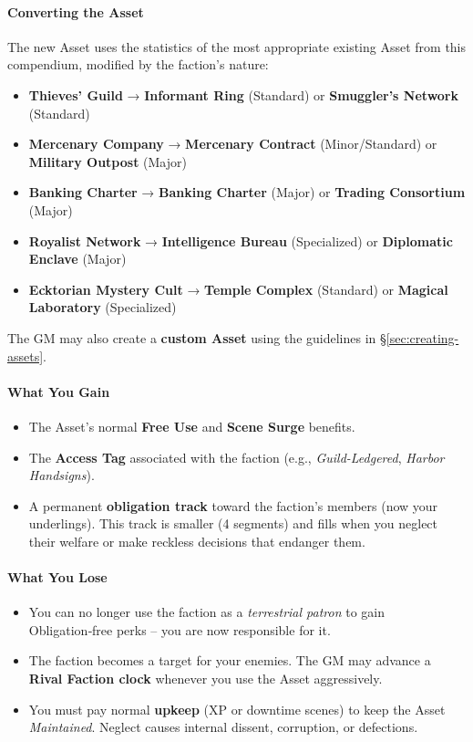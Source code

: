 \begin{tcolorbox}[colback=black!3!white,colframe=black!60!white,title={From Faction to Asset: Taking Over a Terrestrial Patron}]
  \paragraph{Converting the Asset}
  The new Asset uses the statistics of the most appropriate existing Asset from this compendium, modified by the faction’s nature:
  \begin{itemize}
    \item \textbf{Thieves’ Guild} → \textbf{Informant Ring} (Standard) or \textbf{Smuggler’s Network} (Standard)
    \item \textbf{Mercenary Company} → \textbf{Mercenary Contract} (Minor/Standard) or \textbf{Military Outpost} (Major)
    \item \textbf{Banking Charter} → \textbf{Banking Charter} (Major) or \textbf{Trading Consortium} (Major)
    \item \textbf{Royalist Network} → \textbf{Intelligence Bureau} (Specialized) or \textbf{Diplomatic Enclave} (Major)
    \item \textbf{Ecktorian Mystery Cult} → \textbf{Temple Complex} (Standard) or \textbf{Magical Laboratory} (Specialized)
  \end{itemize}
  The GM may also create a \textbf{custom Asset} using the guidelines in \S\ref{sec:creating-assets}.
  
  \paragraph{What You Gain}
  \begin{itemize}
    \item The Asset’s normal \textbf{Free Use} and \textbf{Scene Surge} benefits.
    \item The \textbf{Access Tag} associated with the faction (e.g., \textit{Guild-Ledgered}, \textit{Harbor Handsigns}).
    \item A permanent \textbf{obligation track} toward the faction’s members (now your underlings). This track is smaller (4 segments) and fills when you neglect their welfare or make reckless decisions that endanger them.
  \end{itemize}
  
  \paragraph{What You Lose}
  \begin{itemize}
    \item You can no longer use the faction as a \emph{terrestrial patron} to gain Obligation‑free perks – you are now responsible for it.
    \item The faction becomes a target for your enemies. The GM may advance a \textbf{Rival Faction clock} whenever you use the Asset aggressively.
    \item You must pay normal \textbf{upkeep} (XP or downtime scenes) to keep the Asset \emph{Maintained}. Neglect causes internal dissent, corruption, or defections.
  \end{itemize}
  

\end{tcolorbox}
